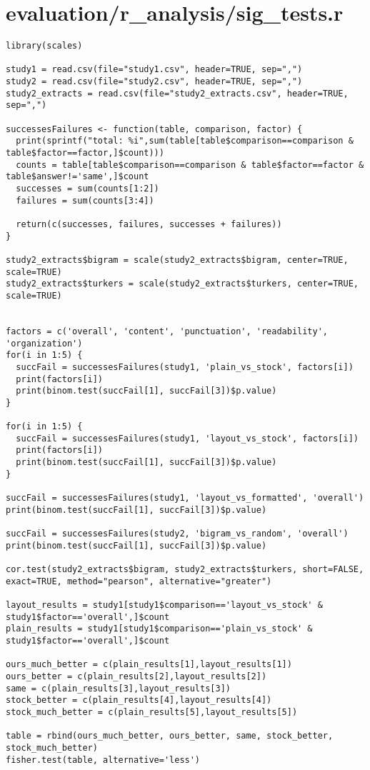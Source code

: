 \documentclass{article}
\begin{document}
\section*{evaluation/r\_analysis/sig\_tests.r}
\begin{verbatim}
library(scales)

study1 = read.csv(file="study1.csv", header=TRUE, sep=",")
study2 = read.csv(file="study2.csv", header=TRUE, sep=",")
study2_extracts = read.csv(file="study2_extracts.csv", header=TRUE, sep=",")

successesFailures <- function(table, comparison, factor) {
  print(sprintf("total: %i",sum(table[table$comparison==comparison & table$factor==factor,]$count)))
  counts = table[table$comparison==comparison & table$factor==factor & table$answer!='same',]$count
  successes = sum(counts[1:2])
  failures = sum(counts[3:4])

  return(c(successes, failures, successes + failures))
}

study2_extracts$bigram = scale(study2_extracts$bigram, center=TRUE, scale=TRUE)
study2_extracts$turkers = scale(study2_extracts$turkers, center=TRUE, scale=TRUE)


factors = c('overall', 'content', 'punctuation', 'readability', 'organization')
for(i in 1:5) {
  succFail = successesFailures(study1, 'plain_vs_stock', factors[i])
  print(factors[i])
  print(binom.test(succFail[1], succFail[3])$p.value)
}

for(i in 1:5) {
  succFail = successesFailures(study1, 'layout_vs_stock', factors[i])
  print(factors[i])
  print(binom.test(succFail[1], succFail[3])$p.value)
}

succFail = successesFailures(study1, 'layout_vs_formatted', 'overall')
print(binom.test(succFail[1], succFail[3])$p.value)

succFail = successesFailures(study2, 'bigram_vs_random', 'overall')
print(binom.test(succFail[1], succFail[3])$p.value)

cor.test(study2_extracts$bigram, study2_extracts$turkers, short=FALSE, exact=TRUE, method="pearson", alternative="greater")

layout_results = study1[study1$comparison=='layout_vs_stock' & study1$factor=='overall',]$count
plain_results = study1[study1$comparison=='plain_vs_stock' & study1$factor=='overall',]$count

ours_much_better = c(plain_results[1],layout_results[1])
ours_better = c(plain_results[2],layout_results[2])
same = c(plain_results[3],layout_results[3])
stock_better = c(plain_results[4],layout_results[4])
stock_much_better = c(plain_results[5],layout_results[5])

table = rbind(ours_much_better, ours_better, same, stock_better, stock_much_better)
fisher.test(table, alternative='less')


\end{verbatim}
\pagebreak
\end{document}
